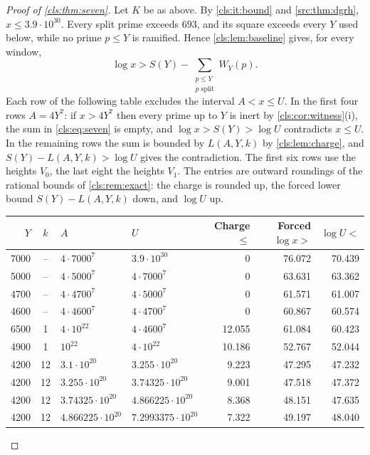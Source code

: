 \begin{proof}[Proof of \cref{cls:thm:seven}]
Let $K$ be as above. By \ref{cls:it:bound} and \cref{src:thm:dgrh},
$x\le3.9\cdot10^{30}$. Every split prime exceeds $693$, and its square exceeds every $Y$
used below, while no prime $p\le Y$ is ramified. Hence \cref{cls:lem:baseline} gives, for
every window,
\begin{equation}\label{cls:eq:seven}
   \log x>S(Y)-\sum_{\substack{p\le Y\\ p\text{ split}}}W_Y(p).
\end{equation}
Each row of the following table excludes the interval $A<x\le U$. In the first four rows
$A=4Y^7$: if $x>4Y^7$ then every prime up to $Y$ is inert by \cref{cls:cor:witness}(i),
the sum in \eqref{cls:eq:seven} is empty, and $\log x>S(Y)>\log U$ contradicts $x\le U$.
In the remaining rows the sum is bounded by $L(A,Y,k)$ by \cref{cls:lem:charge}, and
$S(Y)-L(A,Y,k)>\log U$ gives the contradiction. The first six rows use the heights $V_0$,
the last eight the heights $V_1$. The entries are outward roundings of the rational
bounds of \cref{cls:rem:exact}: the charge is rounded up, the forced lower bound
$S(Y)-L(A,Y,k)$ down, and $\log U$ up.
\begin{center}
\begin{tabular}{rcllrrr}\toprule
$Y$ & $k$ & $A$ & $U$ & Charge $\le$ & Forced $\log x>$ & $\log U<$\\\midrule
7000 & -- & $4\cdot7000^7$ & $3.9\cdot10^{30}$ & 0 & 76.072 & 70.439\\
5000 & -- & $4\cdot5000^7$ & $4\cdot7000^7$ & 0 & 63.631 & 63.362\\
4700 & -- & $4\cdot4700^7$ & $4\cdot5000^7$ & 0 & 61.571 & 61.007\\
4600 & -- & $4\cdot4600^7$ & $4\cdot4700^7$ & 0 & 60.867 & 60.574\\
6500 & 1 & $4\cdot10^{22}$ & $4\cdot4600^7$ & 12.055 & 61.084 & 60.423\\
4900 & 1 & $10^{22}$ & $4\cdot10^{22}$ & 10.186 & 52.767 & 52.044\\
4200 & 12 & $3.1\cdot10^{20}$ & $3.255\cdot10^{20}$ & 9.223 & 47.295 & 47.232\\
4200 & 12 & $3.255\cdot10^{20}$ & $3.74325\cdot10^{20}$ & 9.001 & 47.518 & 47.372\\
4200 & 12 & $3.74325\cdot10^{20}$ & $4.866225\cdot10^{20}$ & 8.368 & 48.151 & 47.635\\
4200 & 12 & $4.866225\cdot10^{20}$ & $7.2993375\cdot10^{20}$ & 7.322 & 49.197 & 48.040\\

\end{tabular}
\end{center}
\end{proof}
